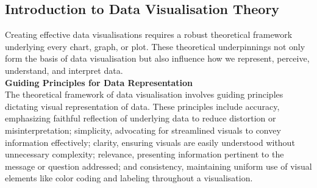 \documentclass{article}\usepackage[]{graphicx}\usepackage[]{xcolor}
\begin{document}
\subsection{Introduction to Data Visualisation Theory}
Creating effective data visualisations requires a robust theoretical framework underlying every chart, graph, or plot. These theoretical underpinnings not only form the basis of data visualisation but also influence how we represent, perceive, understand, and interpret data.\\ 

\noindent \textbf{Guiding Principles for Data Representation}\\
The theoretical framework of data visualisation involves guiding principles dictating visual representation of data. These principles include accuracy, emphasizing faithful reflection of underlying data to reduce distortion or misinterpretation; simplicity, advocating for streamlined visuals to convey information effectively; clarity, ensuring visuals are easily understood without unnecessary complexity; relevance, presenting information pertinent to the message or question addressed; and consistency, maintaining uniform use of visual elements like color coding and labeling throughout a visualisation.\\
\end{document}
